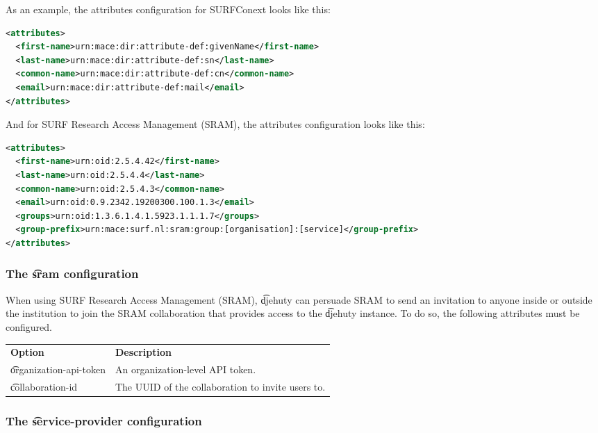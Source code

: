   As an example, the attributes configuration for SURFConext looks like this:

\begin{lstlisting}[language=xml]
<attributes>
  <first-name>urn:mace:dir:attribute-def:givenName</first-name>
  <last-name>urn:mace:dir:attribute-def:sn</last-name>
  <common-name>urn:mace:dir:attribute-def:cn</common-name>
  <email>urn:mace:dir:attribute-def:mail</email>
</attributes>
\end{lstlisting}

  And for SURF Research Access Management (SRAM), the attributes configuration
  looks like this:

\begin{lstlisting}[language=xml]
<attributes>
  <first-name>urn:oid:2.5.4.42</first-name>
  <last-name>urn:oid:2.5.4.4</last-name>
  <common-name>urn:oid:2.5.4.3</common-name>
  <email>urn:oid:0.9.2342.19200300.100.1.3</email>
  <groups>urn:oid:1.3.6.1.4.1.5923.1.1.1.7</groups>
  <group-prefix>urn:mace:surf.nl:sram:group:[organisation]:[service]</group-prefix>
</attributes>
\end{lstlisting}

\subsubsection{The \t{sram} configuration}

  When using SURF Research Access Management (SRAM),
  \t{djehuty} can persuade SRAM to send an invitation to anyone
  inside or outside the institution to join the SRAM collaboration
  that provides access to the \t{djehuty} instance.  To do so,
  the following attributes must be configured.

\begin{tabularx}{\textwidth}{*{1}{!{\VRule[-1pt]}l}!{\VRule[-1pt]}X}
  \headrow
  \textbf{Option}             & \textbf{Description}\\
  \t{organization-api-token}  & An organization-level API token.\\
  \t{collaboration-id}        & The UUID of the collaboration to invite
                                users to.
\end{tabularx}

\subsubsection{The \t{service-provider} configuration}

